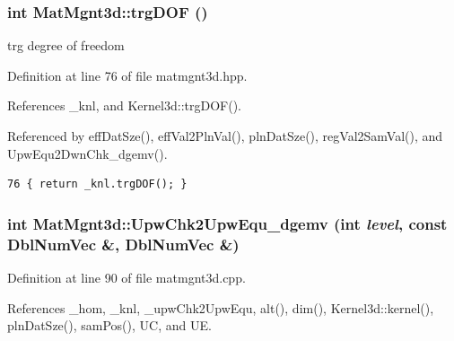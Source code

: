 \subsubsection{\setlength{\rightskip}{0pt plus 5cm}int Mat\-Mgnt3d::trg\-DOF ()\hspace{0.3cm}{\tt  [inline]}}\label{classMatMgnt3d_ea43c1f768349e86110e4e2d06e38d10_ea43c1f768349e86110e4e2d06e38d10}


trg degree of freedom 

Definition at line 76 of file matmgnt3d.hpp.

References \_\-knl, and Kernel3d::trg\-DOF().

Referenced by eff\-Dat\-Sze(), eff\-Val2Pln\-Val(), pln\-Dat\-Sze(), reg\-Val2Sam\-Val(), and Upw\-Equ2Dwn\-Chk\_\-dgemv().

\footnotesize\begin{verbatim}76 { return _knl.trgDOF(); }
\end{verbatim}\normalsize 


\subsubsection{\setlength{\rightskip}{0pt plus 5cm}int Mat\-Mgnt3d::Upw\-Chk2Upw\-Equ\_\-dgemv (int {\em level}, const Dbl\-Num\-Vec \&, Dbl\-Num\-Vec \&)}\label{classMatMgnt3d_6b9d3c2c722c190a882a82cef0429893_6b9d3c2c722c190a882a82cef0429893}




Definition at line 90 of file matmgnt3d.cpp.

References \_\-hom, \_\-knl, \_\-upw\-Chk2Upw\-Equ, alt(), dim(), Kernel3d::kernel(), pln\-Dat\-Sze(), sam\-Pos(), UC, and UE.

